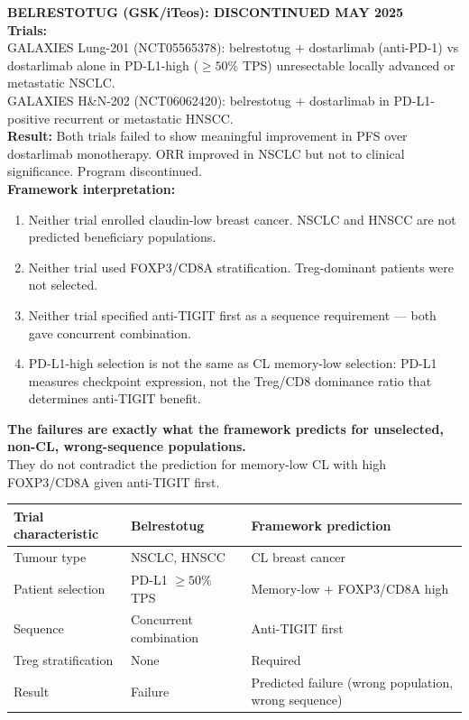 \documentclass[12pt, a4paper]{article}
\begin{document}
\begin{center}
\colorbox{failurebox}{
\begin{minipage}{0.88\textwidth}
\vspace{0.5em}
\textbf{BELRESTOTUG (GSK/iTeos): DISCONTINUED
MAY 2025}\\[0.4em]
\textbf{Trials:}\\
GALAXIES Lung-201 (NCT05565378): belrestotug
$+$ dostarlimab (anti-PD-1) vs dostarlimab alone
in PD-L1-high ($\geq50\%$ TPS) unresectable
locally advanced or metastatic NSCLC.\\[0.3em]
GALAXIES H\&N-202 (NCT06062420): belrestotug
$+$ dostarlimab in PD-L1-positive recurrent or
metastatic HNSCC.\\[0.4em]
\textbf{Result:} Both trials failed to show
meaningful improvement in PFS over dostarlimab
monotherapy. ORR improved in NSCLC but not to
clinical significance. Program discontinued.\\[0.4em]
\textbf{Framework interpretation:}\\
\begin{enumerate}[noitemsep]
    \item Neither trial enrolled claudin-low
    breast cancer. NSCLC and HNSCC are not
    predicted beneficiary populations.
    \item Neither trial used FOXP3/CD8A
    stratification. Treg-dominant patients
    were not selected.
    \item Neither trial specified anti-TIGIT
    first as a sequence requirement ---
    both gave concurrent combination.
    \item PD-L1-high selection is not the
    same as CL memory-low selection: PD-L1
    measures checkpoint expression, not the
    Treg/CD8 dominance ratio that determines
    anti-TIGIT benefit.
\end{enumerate}
\textbf{The failures are exactly what the
framework predicts for unselected, non-CL,
wrong-sequence populations.}\\[0.3em]
They do not contradict the prediction for
memory-low CL with high FOXP3/CD8A given
anti-TIGIT first.
\vspace{0.5em}
\end{minipage}}
\end{center}

\begin{center}
\begin{tabular}{p{4.5cm}p{3.5cm}p{3.5cm}}
\toprule
\textbf{Trial characteristic} &
\textbf{Belrestotug} &
\textbf{Framework prediction} \\
\midrule
Tumour type &
NSCLC, HNSCC &
CL breast cancer \\[0.3em]
Patient selection &
PD-L1 $\geq50\%$ TPS &
Memory-low $+$ FOXP3/CD8A high \\[0.3em]
Sequence &
Concurrent combination &
Anti-TIGIT first \\[0.3em]
Treg stratification &
None &
Required \\[0.3em]
Result &
Failure &
Predicted failure (wrong population,
wrong sequence) \\
\bottomrule
\end{tabular}
\end{center}
\end{document}
